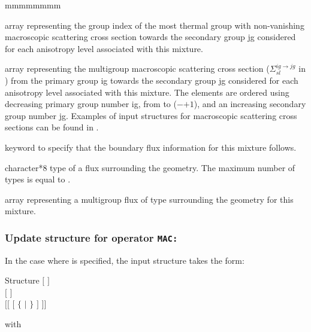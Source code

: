 \begin{ListeDeDescription}{mmmmmmmm}
\item[\dusa{ilastg}] array representing the group index of the most thermal
group with non-vanishing macroscopic scattering cross section towards the
secondary group jg considered for each anisotropy level associated with this
mixture.

\item[\dusa{xsscat}] array representing the multigroup macroscopic scattering
cross section ($\Sigma_{sl}^{ig\to jg}$ in \xsunit) from the primary group ig
towards the secondary group jg considered for each anisotropy level associated
with this mixture. The elements are ordered using decreasing primary group
number ig, from  to ($-$$+1$), and an
increasing secondary group number jg. Examples of input structures for 
macroscopic scattering cross sections can be
found in .

\item[\moc{ADF}] keyword to specify that the boundary flux information for this mixture follows.

\item[\dusa{hadf}] character*8 type of a flux surrounding the geometry. The maximum number of types is equal to .

\item[\dusa{xadf}] array representing a multigroup flux of type  surrounding the geometry for this
mixture. 

\end{ListeDeDescription}

\subsubsection{Update structure for operator {\tt MAC:}}\label{sect:descmacupd}
 
In the case where  is specified, the  input structure takes
the form:

\begin{DataStructure}{Structure }
$[$   $]$ \\
$[$   $]$ \\
$[[$   $[$  $\{$  $|$  $\}$ $]$ $]]$ \\
\moc{;}
\end{DataStructure}

\noindent
with

